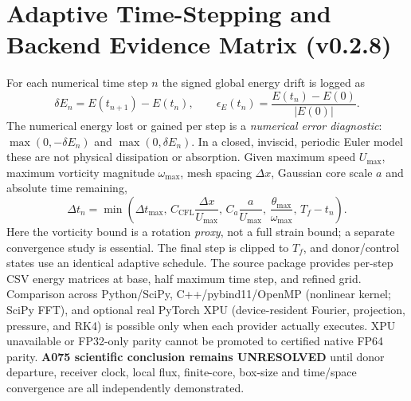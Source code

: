 \documentclass[10pt,a4paper]{article}
\begin{document}
\section{Adaptive Time-Stepping and Backend Evidence Matrix (v0.2.8)}
For each numerical time step $n$ the signed global energy drift is logged as
\begin{equation}
\delta E_n=E(t_{n+1})-E(t_n),\qquad
\epsilon_E(t_n)=\frac{E(t_n)-E(0)}{|E(0)|}.
\end{equation}
The numerical energy lost or gained per step is a \emph{numerical error diagnostic}:
$\max(0,-\delta E_n)$ and $\max(0,\delta E_n)$. In a closed, inviscid,
periodic Euler model these are not physical dissipation or absorption.
Given maximum speed $U_{\max}$, maximum vorticity magnitude $\omega_{\max}$,
mesh spacing $\Delta x$, Gaussian core scale $a$ and absolute time remaining,
\begin{equation}
\Delta t_n=\min\left(\Delta t_{\max},\,
C_{\mathrm{CFL}}\frac{\Delta x}{U_{\max}},\,
C_a\frac{a}{U_{\max}},\,
\frac{\theta_{\max}}{\omega_{\max}},\,T_f-t_n\right).
\end{equation}
Here the vorticity bound is a rotation \emph{proxy}, not a full strain bound;
a separate convergence study is essential. The final step is clipped to $T_f$,
and donor/control states use an identical adaptive schedule.
The source package provides per-step CSV energy matrices at base,
half maximum time step, and refined grid. Comparison across Python/SciPy,
C++/pybind11/OpenMP (nonlinear kernel; SciPy FFT), and optional real
PyTorch XPU (device-resident Fourier, projection, pressure, and RK4) is
possible only when each provider actually executes. XPU unavailable or
FP32-only parity cannot be promoted to certified native FP64 parity.
\textbf{A075 scientific conclusion remains UNRESOLVED} until donor departure,
receiver clock, local flux, finite-core, box-size and time/space convergence
are all independently demonstrated.
\end{document}
